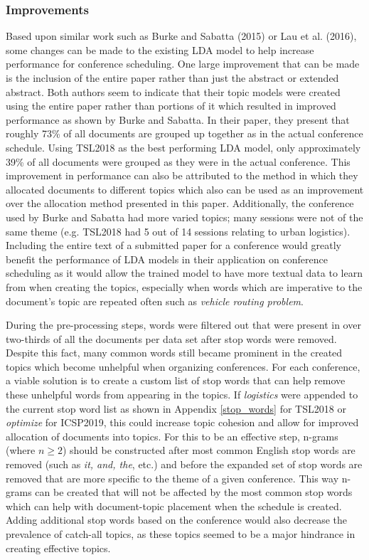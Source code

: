 \documentclass[a4paper, 12pt, twoside]{article}
\numberwithin{equation}{section} %
\begin{document}
\subsubsection{Improvements}

Based upon similar work such as Burke and Sabatta (2015) or Lau et al. (2016), some changes can be made to the existing LDA model to help increase performance for conference scheduling. One large improvement that can be made is the inclusion of the entire paper rather than just the abstract or extended abstract. Both authors seem to indicate that their topic models were created using the entire paper rather than portions of it which resulted in improved performance as shown by Burke and Sabatta. In their paper, they present that roughly 73\% of all documents are grouped up together as in the actual conference schedule. Using TSL2018 as the best performing LDA model, only approximately 39\% of all documents were grouped as they were in the actual conference. This improvement in performance can also be attributed to the method in which they allocated documents to different topics which also can be used as an improvement over the allocation method presented in this paper. Additionally, the conference used by Burke and Sabatta had more varied topics; many sessions were not of the same theme (e.g. TSL2018 had 5 out of 14 sessions relating to urban logistics). Including the entire text of a submitted paper for a conference would greatly benefit the performance of LDA models in their application on conference scheduling as it would allow the trained model to have more textual data to learn from when creating the topics, especially when words which are imperative to the document's topic are repeated often such as \textit{vehicle routing problem}. 

During the pre-processing steps, words were filtered out that were present in over two-thirds of all the documents per data set after stop words were removed. Despite this fact, many common words still became prominent in the created topics which become unhelpful when organizing conferences. For each conference, a viable solution is to create a custom list of stop words that can help remove these unhelpful words from appearing in the topics. If \textit{logistics} were appended to the current stop word list as shown in Appendix \ref{stop_words} for TSL2018 or \textit{optimize} for ICSP2019, this could increase topic cohesion and allow for improved allocation of documents into topics. For this to be an effective step, n-grams (where $n \ge 2$) should be constructed after most common English stop words are removed (such as \textit{it, and, the}, etc.) and before the expanded set of stop words are removed that are more specific to the theme of a given conference. This way n-grams can be created that will not be affected by the most common stop words which can help with document-topic placement when the schedule is created. Adding additional stop words based on the conference would also decrease the prevalence of catch-all topics, as these topics seemed to be a major hindrance in creating effective topics.  
\end{document}

